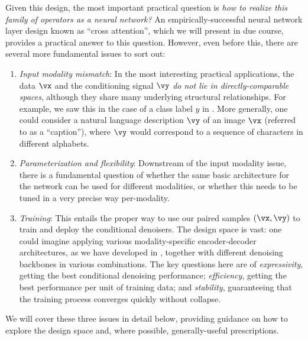 \documentclass[../../book-main.tex]{subfiles}
\begin{document}
Given this design, the most important practical question is \textit{how to
realize this family of operators as a neural network?}
An empirically-successful neural network layer design known as ``cross
attention'', which we will present in due course, provides a practical answer
to this question. However, even before this, there are several more fundamental
issues to sort out:
\begin{enumerate}
    \item \textit{Input modality mismatch}: In the most interesting practical
        applications, the data $\vx$ and the conditioning signal $\vy$
        \textit{do not lie in directly-comparable spaces}, although they share
        many underlying structural relationships. For example, we saw this in
        the case of a class label $y$ in . More generally, one
        could consider a natural language description $\vy$ of an image $\vx$
        (referred to as a ``caption''), where $\vy$ would correspond to
        a sequence of characters in different alphabets.
    \item \textit{Parameterization and flexibility}: Downstream of the input
        modality issue, there is a fundamental question of whether the same
        basic architecture for the network can be used for different modalities,
        or whether this needs to be tuned in a very precise way per-modality.
    \item \textit{Training}: This entails the proper way to use our paired
        samples $(\vx, \vy)$ to train and deploy the conditional denoisers. The
        design space is vast: one could imagine applying various
        modality-specific encoder-decoder architectures, as we have developed in
        , together with
        different denoising backbones in various combinations. The key questions
        here are of \textit{expressivity}, getting the best conditional
        denoising performance; \textit{efficiency}, getting the best
        performance per unit of training data; and \textit{stability},
        guaranteeing that the training process converges quickly without
        collapse.
\end{enumerate}

We will cover these three issues in detail below, providing guidance on how to
explore the design space and, where possible, generally-useful prescriptions.
\end{document}
